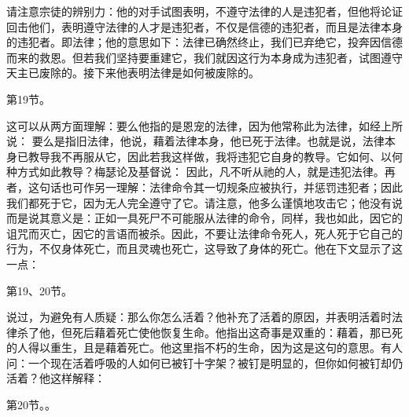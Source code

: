 请注意宗徒的辨别力：他的对手试图表明，不遵守法律的人是违犯者，但他将论证回击他们，表明遵守法律的人才是违犯者，不仅是信德的违犯者，而且是法律本身的违犯者。即法律；他的意思如下：法律已确然终止，我们已弃绝它，投奔因信德而来的救恩。但若我们坚持要重建它，我们就因这行为本身成为违犯者，试图遵守天主已废除的。接下来他表明法律是如何被废除的。\par

第19节。 \par

这可以从两方面理解：要么他指的是恩宠的法律，因为他常称此为法律，如经上所说：  要么是指旧法律，他说，藉着法律本身，他已死于法律。也就是说，法律本身已教导我不再服从它，因此若我这样做，我将违犯它自身的教导。它如何、以何种方式如此教导？梅瑟论及基督说：  因此，凡不听从祂的人，就是违犯法律。再者，这句话也可作另一理解：法律命令其一切规条应被执行，并惩罚违犯者；因此我们都死于它，因为无人完全遵守了它。请注意，他多么谨慎地攻击它；他没有说而是说其意义是：正如一具死尸不可能服从法律的命令，同样，我也如此，因它的诅咒而灭亡，因它的言语而被杀。因此，不要让法律命令死人，死人死于它自己的行为，不仅身体死亡，而且灵魂也死亡，这导致了身体的死亡。他在下文显示了这一点：\par

第19、20节。\par

说过，为避免有人质疑：那么你怎么活着？他补充了活着的原因，并表明活着时法律杀了他，但死后藉着死亡使他恢复生命。他指出这奇事是双重的：藉着，那已死的人得以重生，且是藉着死亡。他这里指不朽的生命，因为这是这句的意思。有人问：一个现在活着呼吸的人如何已被钉十字架？被钉是明显的，但你如何被钉却仍活着？他这样解释：\par

第20节。。\par

